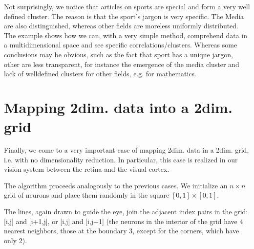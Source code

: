 \documentclass[a4paper,12pt,polish]{jupyterBook}
\begin{document}
\sphinxAtStartPar
Not surprisingly, we notice that articles on sports are special and form a very well defined cluster. The reason is that the sport’s jargon is very specific. The Media are also distinguished, whereas other fields are more\sphinxhyphen{}less uniformly distributed. The example shows how we can, with a very simple method, comprehend data in a multidimensional space and see specific correlations/clusters. Whereas some conclusions may be obvious, such as the fact that sport has a unique jargon, other are less transparent, for instance the emergence of the media cluster and lack of well\sphinxhyphen{}defined clusters for other fields, e.g. for mathematics.


\section{Mapping 2\sphinxhyphen{}dim. data into a 2\sphinxhyphen{}dim. grid}
\label{\detokenize{docs/som:mapping-2-dim-data-into-a-2-dim-grid}}
\sphinxAtStartPar
Finally, we come to a very important case of mapping 2\sphinxhyphen{}dim. data in a 2\sphinxhyphen{}dim. grid, i.e. with no dimensionality reduction. In particular, this case is realized in our vision system between the retina and the visual cortex.

\sphinxAtStartPar
The algorithm proceeds analogously to the previous cases. We initialize an \(n \times n\) grid of neurons and place them randomly in the square \([0,1]\times [0,1]\).
\begin{sphinxVerbatimInput}

\begin{sphinxVerbatim}[commandchars=\\\{\}]
\PYG{p}{[}    \PYG{p}{]}
\end{sphinxVerbatim}
\end{sphinxVerbatimInput}

\sphinxAtStartPar
The lines, again drawn to guide the eye, join the adjacent index pairs in the grid: {[}i,j{]} and {[}i+1,j{]}, or {[}i,j{]} and {[}i,j+1{]} (the neurons in the interior of the grid have 4 nearest neighbors, those at the boundary 3, except for the corners, which have only 2).
\begin{sphinxVerbatimOutput}

\noindent{}
\end{sphinxVerbatimOutput}
\end{document}
